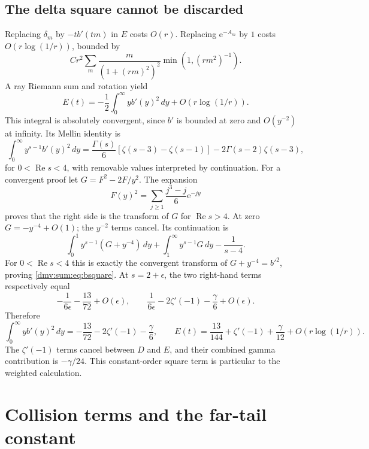 \documentclass[11pt,letterpaper]{article}
\numberwithin{equation}{section}
\theoremstyle{definition}\newtheorem{definition}[theorem]{Definition}
\theoremstyle{remark}\newtheorem{remark}[theorem]{Remark}
\newcommand{\ee}{\mathrm e}
\DeclareMathOperator{\Rea}{Re}
\begin{document}
\subsection{The delta square cannot be discarded}
Replacing $\delta_m$ by $-tb'(tm)$ in $E$ costs $O(r)$. Replacing $\ee^{-A_m}$ by $1$ costs $O(r\log(1/r))$, bounded by
\[
 Cr^2\sum_m\frac{m}{(1+(rm)^2)^2}\min(1,(rm^2)^{-1}).
\]
A ray Riemann sum and rotation yield
\begin{equation}\label{dmv:sum:eq:Eint}
 E(t)=-\frac12\int_0^\infty yb'(y)^2\,dy+O(r\log(1/r)).
\end{equation}
This integral is absolutely convergent, since $b'$ is bounded at zero and $O(y^{-2})$ at infinity. Its Mellin identity is
\begin{equation}\label{dmv:sum:eq:bsquare}
 \int_0^\infty y^{s-1}b'(y)^2\,dy
 =\frac{\Gamma(s)}6[\zeta(s-3)-\zeta(s-1)]-2\Gamma(s-2)\zeta(s-3),
\end{equation}
for $0<\Rea s<4$, with removable values interpreted by continuation. For a convergent proof let $G=F^2-2F/y^2$. The expansion
\[
 F(y)^2=\sum_{j\ge1}\frac{j^3-j}{6}\ee^{-jy}
\]
proves that the right side is the transform of $G$ for $\Rea s>4$. At zero $G=-y^{-4}+O(1)$; the $y^{-2}$ terms cancel. Its continuation is
\[
 \int_0^1y^{s-1}(G+y^{-4})\,dy+\int_1^\infty y^{s-1}G\,dy-\frac1{s-4}.
\]
For $0<\Rea s<4$ this is exactly the convergent transform of $G+y^{-4}=b'^2$, proving \eqref{dmv:sum:eq:bsquare}. At $s=2+\epsilon$, the two right-hand terms respectively equal
\[
 -\frac1{6\epsilon}-\frac{13}{72}+O(\epsilon),\qquad
 \frac1{6\epsilon}-2\zeta'(-1)-\frac\gamma6+O(\epsilon).
\]
Therefore
\begin{equation}\label{dmv:sum:eq:E}
 \int_0^\infty yb'(y)^2\,dy=-\frac{13}{72}-2\zeta'(-1)-\frac\gamma6,
 \qquad
 E(t)=\frac{13}{144}+\zeta'(-1)+\frac\gamma{12}+O(r\log(1/r)).
\end{equation}
The $\zeta'(-1)$ terms cancel between $D$ and $E$, and their combined gamma contribution is $-\gamma/24$. This constant-order square term is particular to the weighted calculation.

\section{Collision terms and the far-tail constant}\label{dmv:sum:sec:collisions}
\end{document}
